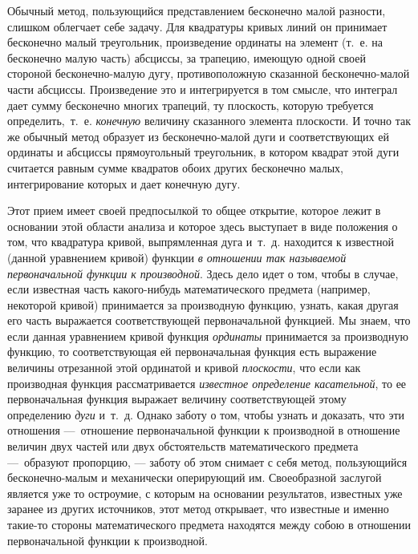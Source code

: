 Обычный метод, пользующийся представлением бесконечно малой разности,
слишком облегчает себе задачу. Для квадратуры кривых линий он принимает
бесконечно малый треугольник, произведение ординаты на элемент (т.~е. на
бесконечно малую часть) абсциссы, за трапецию, имеющую одной своей стороной
бесконечно-малую дугу, противоположную сказанной бесконечно-малой части
абсциссы. Произведение это и интегрируется в том смысле, что интеграл дает
сумму бесконечно многих трапеций, ту плоскость, которую требуется
определить,~т.~е. {\em конечную} величину сказанного
элемента плоскости. И точно так же обычный метод образует из
бесконечно-малой дуги и соответствующих ей ординаты и абсциссы
прямоугольный треугольник, в котором квадрат этой дуги считается равным
сумме квадратов обоих других бесконечно малых, интегрирование которых и
дает конечную дугу.

Этот прием имеет своей предпосылкой то общее открытие, которое лежит в
основании этой области анализа и которое здесь выступает в виде положения о
том, что квадратура кривой, выпрямленная дуга и~т.~д. находится к известной
(данной уравнением кривой) функции {\em в отношении так
называемой первоначальной функции к производной}. Здесь дело идет о том,
чтобы в случае, если известная часть какого-нибудь математического предмета
(например, некоторой кривой) принимается за производную функцию, узнать,
какая другая его часть выражается соответствующей первоначальной функцией.
Мы знаем, что если данная уравнением кривой функция
{\em ординаты} принимается за производную функцию, то
соответствующая ей первоначальная функция есть выражение величины
отрезанной этой ординатой и кривой {\em плоскости}, что
если как производная функция рассматривается
{\em известное определение касательной}, то ее
первоначальная функция выражает величину соответствующей этому определению
{\em дуги} и~т.~д. Однако заботу о том, чтобы узнать и
доказать, что эти отношения —~отношение первоначальной функции к
производной в отношение величин двух частей или двух обстоятельств
математического предмета —~образуют пропорцию, — заботу об этом снимает с
себя метод, пользующийся бесконечно-малым и механически оперирующий им.
Своеобразной заслугой является уже то остроумие, с которым на основании
результатов, известных уже заранее из других источников, этот метод
открывает, что известные и именно такие-то стороны математического предмета
находятся между собою в отношении первоначальной функции к производной.

